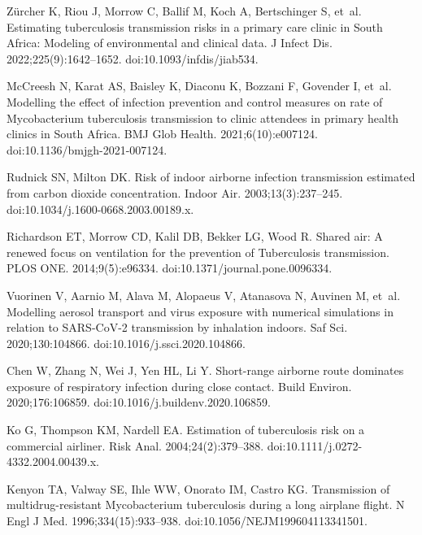\documentclass[fleqn,11pt]{wlscirep}
\begin{document}
\begin{thebibliography}{10}
Zürcher K, Riou J, Morrow C, Ballif M, Koch A, Bertschinger S, et~al.
\newblock Estimating tuberculosis transmission risks in a primary care clinic
  in {South} {Africa}: {Modeling} of environmental and clinical data.
\newblock J Infect Dis. 2022;225(9):1642--1652.
\newblock doi:10.1093/infdis/jiab534.

McCreesh N, Karat AS, Baisley K, Diaconu K, Bozzani F, Govender I, et~al.
\newblock Modelling the effect of infection prevention and control measures on
  rate of {Mycobacterium} tuberculosis transmission to clinic attendees in
  primary health clinics in {South} {Africa}.
\newblock BMJ Glob Health. 2021;6(10):e007124.
\newblock doi:10.1136/bmjgh-2021-007124.

Rudnick SN, Milton DK.
\newblock Risk of indoor airborne infection transmission estimated from carbon
  dioxide concentration.
\newblock Indoor Air. 2003;13(3):237--245.
\newblock doi:10.1034/j.1600-0668.2003.00189.x.

Richardson ET, Morrow CD, Kalil DB, Bekker LG, Wood R.
\newblock Shared air: {A} renewed focus on ventilation for the prevention of
  {Tuberculosis} transmission.
\newblock PLOS ONE. 2014;9(5):e96334.
\newblock doi:10.1371/journal.pone.0096334.

Vuorinen V, Aarnio M, Alava M, Alopaeus V, Atanasova N, Auvinen M, et~al.
\newblock Modelling aerosol transport and virus exposure with numerical
  simulations in relation to {SARS}-{CoV}-2 transmission by inhalation indoors.
\newblock Saf Sci. 2020;130:104866.
\newblock doi:10.1016/j.ssci.2020.104866.

Chen W, Zhang N, Wei J, Yen HL, Li Y.
\newblock Short-range airborne route dominates exposure of respiratory
  infection during close contact.
\newblock Build Environ. 2020;176:106859.
\newblock doi:10.1016/j.buildenv.2020.106859.

Ko G, Thompson KM, Nardell EA.
\newblock Estimation of tuberculosis risk on a commercial airliner.
\newblock Risk Anal. 2004;24(2):379--388.
\newblock doi:10.1111/j.0272-4332.2004.00439.x.

Kenyon TA, Valway SE, Ihle WW, Onorato IM, Castro KG.
\newblock Transmission of multidrug-resistant {Mycobacterium} tuberculosis
  during a long airplane flight.
\newblock N Engl J Med. 1996;334(15):933--938.
\newblock doi:10.1056/NEJM199604113341501.


\end{thebibliography}
\end{document}
